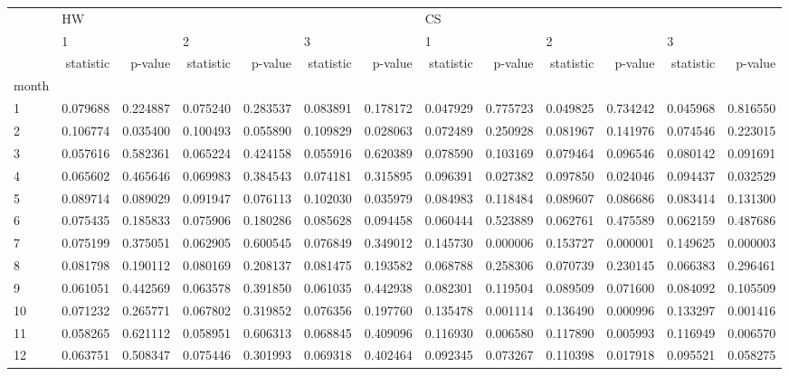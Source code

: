 \begin{tabular}{lrrrrrrrrrrrr}
\toprule
{} & \multicolumn{6}{l}{HW} & \multicolumn{6}{l}{CS} \\
{} & \multicolumn{2}{l}{1} & \multicolumn{2}{l}{2} & \multicolumn{2}{l}{3} & \multicolumn{2}{l}{1} & \multicolumn{2}{l}{2} & \multicolumn{2}{l}{3} \\
{} & statistic &   p-value & statistic &   p-value & statistic &   p-value & statistic &   p-value & statistic &   p-value & statistic &   p-value \\
month &           &           &           &           &           &           &           &           &           &           &           &           \\
\midrule
1     &  0.079688 &  0.224887 &  0.075240 &  0.283537 &  0.083891 &  0.178172 &  0.047929 &  0.775723 &  0.049825 &  0.734242 &  0.045968 &  0.816550 \\
2     &  0.106774 &  0.035400 &  0.100493 &  0.055890 &  0.109829 &  0.028063 &  0.072489 &  0.250928 &  0.081967 &  0.141976 &  0.074546 &  0.223015 \\
3     &  0.057616 &  0.582361 &  0.065224 &  0.424158 &  0.055916 &  0.620389 &  0.078590 &  0.103169 &  0.079464 &  0.096546 &  0.080142 &  0.091691 \\
4     &  0.065602 &  0.465646 &  0.069983 &  0.384543 &  0.074181 &  0.315895 &  0.096391 &  0.027382 &  0.097850 &  0.024046 &  0.094437 &  0.032529 \\
5     &  0.089714 &  0.089029 &  0.091947 &  0.076113 &  0.102030 &  0.035979 &  0.084983 &  0.118484 &  0.089607 &  0.086686 &  0.083414 &  0.131300 \\
6     &  0.075435 &  0.185833 &  0.075906 &  0.180286 &  0.085628 &  0.094458 &  0.060444 &  0.523889 &  0.062761 &  0.475589 &  0.062159 &  0.487686 \\
7     &  0.075199 &  0.375051 &  0.062905 &  0.600545 &  0.076849 &  0.349012 &  0.145730 &  0.000006 &  0.153727 &  0.000001 &  0.149625 &  0.000003 \\
8     &  0.081798 &  0.190112 &  0.080169 &  0.208137 &  0.081475 &  0.193582 &  0.068788 &  0.258306 &  0.070739 &  0.230145 &  0.066383 &  0.296461 \\
9     &  0.061051 &  0.442569 &  0.063578 &  0.391850 &  0.061035 &  0.442938 &  0.082301 &  0.119504 &  0.089509 &  0.071600 &  0.084092 &  0.105509 \\
10    &  0.071232 &  0.265771 &  0.067802 &  0.319852 &  0.076356 &  0.197760 &  0.135478 &  0.001114 &  0.136490 &  0.000996 &  0.133297 &  0.001416 \\
11    &  0.058265 &  0.621112 &  0.058951 &  0.606313 &  0.068845 &  0.409096 &  0.116930 &  0.006580 &  0.117890 &  0.005993 &  0.116949 &  0.006570 \\
12    &  0.063751 &  0.508347 &  0.075446 &  0.301993 &  0.069318 &  0.402464 &  0.092345 &  0.073267 &  0.110398 &  0.017918 &  0.095521 &  0.058275 \\
\bottomrule
\end{tabular}

